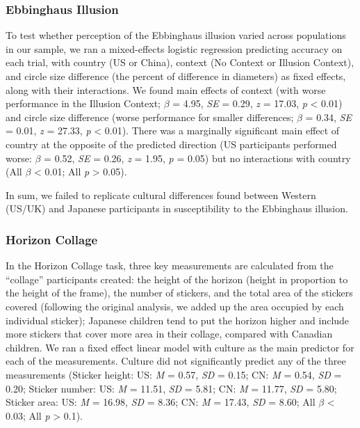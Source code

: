 \documentclass[
  man,floatsintext]{apa6}
\begin{document}
\hypertarget{ebbinghaus-illusion-1}{%
\subsubsection{Ebbinghaus Illusion}\label{ebbinghaus-illusion-1}}

To test whether perception of the Ebbinghaus illusion varied across populations in our sample, we ran a mixed-effects logistic regression predicting accuracy on each trial, with country (US or China), context (No Context or Illusion Context), and circle size difference (the percent of difference in diameters) as fixed effects, along with their interactions. We found main effects of context (with worse performance in the Illusion Context; \(\beta\) = 4.95, \emph{SE} = 0.29, \emph{z} = 17.03, \emph{p} \textless{} 0.01) and circle size difference (worse performance for smaller differences; \(\beta\) = 0.34, \emph{SE} = 0.01, \emph{z} = 27.33, \emph{p} \textless{} 0.01). There was a marginally significant main effect of country at the opposite of the predicted direction (US participants performed worse: \(\beta\) = 0.52, \emph{SE} = 0.26, \emph{z} = 1.95, \emph{p} = 0.05) but no interactions with country (All \(\beta\) \textless{} 0.01; All \emph{p} \textgreater{} 0.05).

In sum, we failed to replicate cultural differences found between Western (US/UK) and Japanese participants in susceptibility to the Ebbinghaus illusion.

\hypertarget{horizon-collage-1}{%
\subsubsection{Horizon Collage}\label{horizon-collage-1}}

In the Horizon Collage task, three key measurements are calculated from the ``collage'' participants created: the height of the horizon (height in proportion to the height of the frame), the number of stickers, and the total area of the stickers covered (following the original analysis, we added up the area occupied by each individual sticker); Japanese children tend to put the horizon higher and include more stickers that cover more area in their collage, compared with Canadian children. We ran a fixed effect linear model with culture as the main predictor for each of the measurements. Culture did not significantly predict any of the three measurements (Sticker height: US: \emph{M} = 0.57, \emph{SD} = 0.15; CN: \emph{M} = 0.54, \emph{SD} = 0.20; Sticker number: US: \emph{M} = 11.51, \emph{SD} = 5.81; CN: \emph{M} = 11.77, \emph{SD} = 5.80; Sticker area: US: \emph{M} = 16.98, \emph{SD} = 8.36; CN: \emph{M} = 17.43, \emph{SD} = 8.60; All \(\beta\) \textless{} 0.03; All \emph{p} \textgreater{} 0.1).
\end{document}
